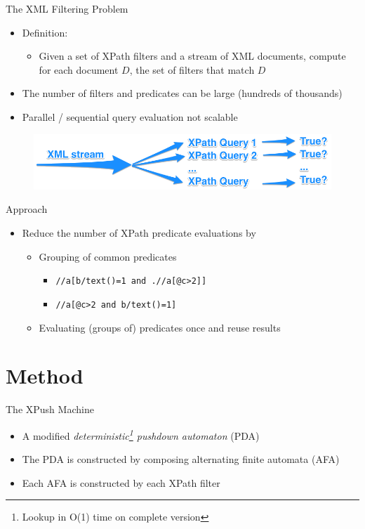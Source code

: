 \documentclass[mathserif,serif]{beamer}
\begin{document}
\begin{frame}{The XML Filtering Problem}
  \begin{itemize}
    \item Definition:
      \begin{itemize}
        \item Given a set of XPath filters and a stream of XML documents, compute for each document $D$, the set of filters that match $D$
      \end{itemize}
    \item The number of filters and predicates can be large (hundreds of thousands)
    \item Parallel / sequential query evaluation not scalable
  \end{itemize}
  \begin{figure}[b]
    \centering
    \includegraphics[width=\linewidth]{processing-problem.png}
  \end{figure}
\end{frame}

\begin{frame}{Approach}
  \begin{itemize}
    \item Reduce the number of XPath predicate evaluations by
    \begin{itemize}
      \item Grouping of common predicates
        \begin{itemize}
          \item[] \texttt{//a[b/text()=1 and .//a[@c>2]]}
          \item[] \texttt{//a[@c>2 and b/text()=1]}
        \end{itemize}
      \item Evaluating (groups of) predicates once and reuse results
    \end{itemize}
  \end{itemize}
\end{frame}

\section{Method}
\begin{frame}{The XPush Machine}
  \begin{itemize}
    \item A modified \emph{deterministic\footnote{Lookup in O(1) time on complete version} pushdown automaton} (PDA)
    \item The PDA is constructed by composing alternating finite automata (AFA)
    \item Each AFA is constructed by each XPath filter
  \end{itemize}
\end{frame}
\end{document}
